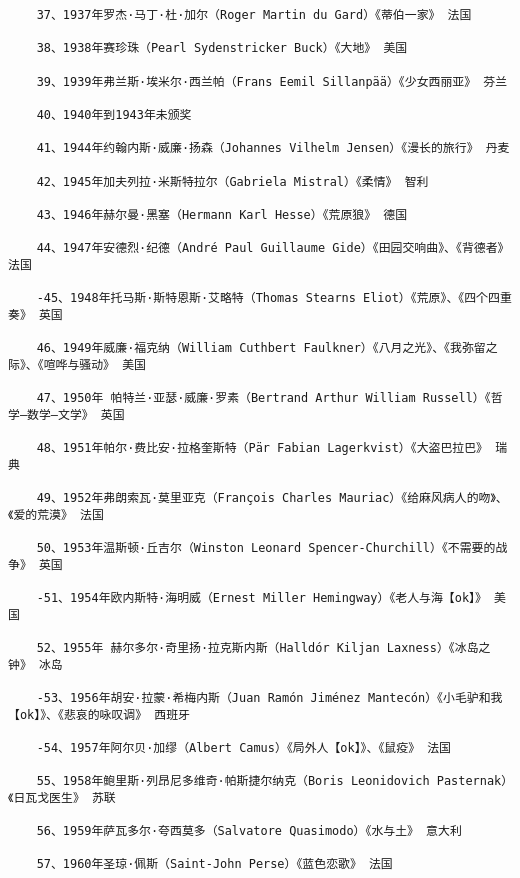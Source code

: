 \documentclass[UTF8]{../RepresentationUniverse}
\begin{document}
\begin{lstlisting}
    37、1937年罗杰·马丁·杜·加尔（Roger Martin du Gard）《蒂伯一家》 法国
    
    38、1938年赛珍珠（Pearl Sydenstricker Buck）《大地》 美国
    
    39、1939年弗兰斯·埃米尔·西兰帕（Frans Eemil Sillanpää）《少女西丽亚》 芬兰
    
    40、1940年到1943年未颁奖
    
    41、1944年约翰内斯·威廉·扬森（Johannes Vilhelm Jensen）《漫长的旅行》 丹麦
    
    42、1945年加夫列拉·米斯特拉尔（Gabriela Mistral）《柔情》 智利
    
    43、1946年赫尔曼·黑塞（Hermann Karl Hesse）《荒原狼》 德国
    
    44、1947年安德烈·纪德（André Paul Guillaume Gide）《田园交响曲》、《背德者》 法国
    
    -45、1948年托马斯·斯特恩斯·艾略特（Thomas Stearns Eliot）《荒原》、《四个四重奏》 英国
    
    46、1949年威廉·福克纳（William Cuthbert Faulkner）《八月之光》、《我弥留之际》、《喧哗与骚动》 美国
    
    47、1950年 帕特兰·亚瑟·威廉·罗素（Bertrand Arthur William Russell）《哲学—数学—文学》 英国
    
    48、1951年帕尔·费比安·拉格奎斯特（Pär Fabian Lagerkvist）《大盗巴拉巴》 瑞典
    
    49、1952年弗朗索瓦·莫里亚克（François Charles Mauriac）《给麻风病人的吻》、《爱的荒漠》 法国
    
    50、1953年温斯顿·丘吉尔（Winston Leonard Spencer-Churchill）《不需要的战争》 英国
    
    -51、1954年欧内斯特·海明威（Ernest Miller Hemingway）《老人与海【ok】》 美国
    
    52、1955年 赫尔多尔·奇里扬·拉克斯内斯（Halldór Kiljan Laxness）《冰岛之钟》 冰岛
    
    -53、1956年胡安·拉蒙·希梅内斯（Juan Ramón Jiménez Mantecón）《小毛驴和我【ok】》、《悲哀的咏叹调》 西班牙
    
    -54、1957年阿尔贝·加缪（Albert Camus）《局外人【ok】》、《鼠疫》 法国
    
    55、1958年鲍里斯·列昂尼多维奇·帕斯捷尔纳克（Boris Leonidovich Pasternak）《日瓦戈医生》 苏联
    
    56、1959年萨瓦多尔·夸西莫多（Salvatore Quasimodo）《水与土》 意大利
    
    57、1960年圣琼·佩斯（Saint-John Perse）《蓝色恋歌》 法国
    

\end{lstlisting}
\end{document}
